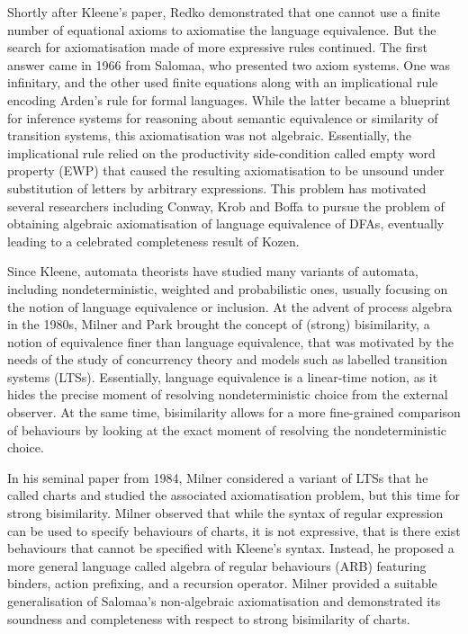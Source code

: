 Shortly after Kleene's paper, Redko demonstrated that one cannot use a finite number of equational axioms to axiomatise the language equivalence. But the search for axiomatisation made of more expressive rules continued. The first answer came in 1966 from Salomaa, who presented two axiom systems. One was infinitary, and the other used finite equations along with an implicational rule encoding Arden's rule for formal languages. While the latter became a blueprint for inference systems for reasoning about semantic equivalence or similarity of transition systems, this axiomatisation was not algebraic. Essentially, the implicational rule relied on the productivity side-condition called empty word property (EWP) that caused the resulting axiomatisation to be unsound under substitution of letters by arbitrary expressions. This problem has motivated several researchers including Conway, Krob and Boffa to pursue the problem of obtaining algebraic axiomatisation of language equivalence of DFAs, eventually leading to a celebrated completeness result of Kozen.

Since Kleene, automata theorists have studied many variants of automata, including nondeterministic, weighted and probabilistic ones, usually focusing on the notion of language equivalence or inclusion. At the advent of process algebra in the 1980s, Milner and Park brought the concept of (strong) bisimilarity, a notion of equivalence finer than language equivalence, that was motivated by the needs of the study of concurrency theory and models such as labelled transition systems (LTSs). Essentially, language equivalence is a linear-time notion, as it hides the precise moment of resolving nondeterministic choice from the external observer. At the same time, bisimilarity allows for a more fine-grained comparison of behaviours by looking at the exact moment of resolving the nondeterministic choice. 

In his seminal paper from 1984, Milner considered a variant of LTSs that he called charts and studied the associated axiomatisation problem, but this time for strong bisimilarity. Milner observed that while the syntax of regular expression can be used to specify behaviours of charts, it is not expressive, that is there exist behaviours that cannot be specified with Kleene's syntax. Instead, he proposed a more general language called algebra of regular behaviours (ARB) featuring binders, action prefixing, and a recursion operator. Milner provided a suitable generalisation of Salomaa's non-algebraic axiomatisation and demonstrated its soundness and completeness with respect to strong bisimilarity of charts.   

